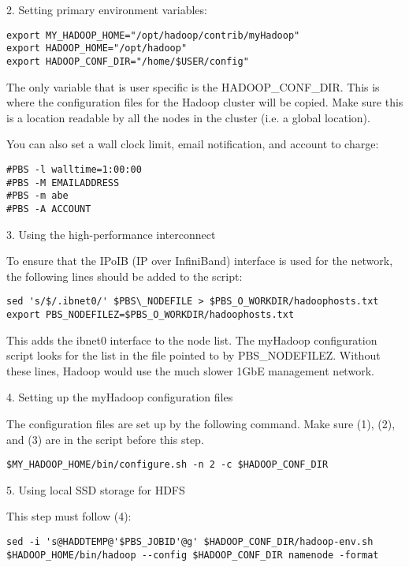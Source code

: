 2. Setting primary environment variables:

\begin{verbatim}
export MY_HADOOP_HOME="/opt/hadoop/contrib/myHadoop"
export HADOOP_HOME="/opt/hadoop"
export HADOOP_CONF_DIR="/home/$USER/config"
\end{verbatim}

The only variable that is user specific is the HADOOP\_CONF\_DIR. This
is where the configuration files for the Hadoop cluster will be
copied. Make sure this is a location readable by all the nodes in the
cluster (i.e. a global location).

You can also set a wall clock limit, email notification, and account
to charge:

\begin{verbatim}
#PBS -l walltime=1:00:00
#PBS -M EMAILADDRESS
#PBS -m abe
#PBS -A ACCOUNT
\end{verbatim}

3. Using the high-performance interconnect

To ensure that the IPoIB (IP over InfiniBand) interface is used for
the network, the following lines should be added to the script:

\begin{verbatim}
sed 's/$/.ibnet0/' $PBS\_NODEFILE > $PBS_O_WORKDIR/hadoophosts.txt
export PBS_NODEFILEZ=$PBS_O_WORKDIR/hadoophosts.txt
\end{verbatim}

This adds the ibnet0 interface to the node list. The myHadoop
configuration script looks for the list in the file pointed to by
PBS\_NODEFILEZ. Without these lines, Hadoop would use the much slower
1GbE management network.

4. Setting up the myHadoop configuration files

The configuration files are set up by the following command. Make sure
(1), (2), and (3) are in the script before this step.

\begin{verbatim}
$MY_HADOOP_HOME/bin/configure.sh -n 2 -c $HADOOP_CONF_DIR
\end{verbatim}

5. Using local SSD storage for HDFS

This step must follow (4):
\begin{verbatim}
sed -i 's@HADDTEMP@'$PBS_JOBID'@g' $HADOOP_CONF_DIR/hadoop-env.sh
$HADOOP_HOME/bin/hadoop --config $HADOOP_CONF_DIR namenode -format
\end{verbatim}

